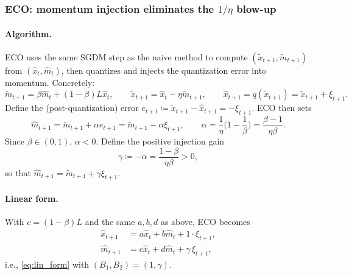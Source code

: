 \documentclass[11pt, a4paper, onecolumn, copyright, goog]{google}
\theoremstyle{plain}
\theoremstyle{definition}
\theoremstyle{remark}
\begin{document}
\subsubsection{ECO: momentum injection eliminates the $1/\eta$ blow-up}

\paragraph{Algorithm.}
ECO uses the same SGDM step as the naive method to compute $(\tilde x_{t+1},\tilde m_{t+1})$ from $(\hat x_t,\hat m_t)$,
then quantizes and injects the quantization error into momentum.
Concretely:
\begin{equation}
    \tilde m_{t+1}=\beta \hat m_t + (1-\beta)L\hat x_t,\qquad
    \tilde x_{t+1}=\hat x_t-\eta \tilde m_{t+1},\qquad
    \hat x_{t+1}=q(\tilde x_{t+1})=\tilde x_{t+1}+\xi_{t+1}.
\end{equation}
Define the (post-quantization) error $e_{t+1}\coloneqq \tilde x_{t+1}-\hat x_{t+1}=-\xi_{t+1}$. ECO then sets
\begin{equation}
\label{eq:eco_inject}
    \hat m_{t+1}=\tilde m_{t+1}+\alpha e_{t+1}
    = \tilde m_{t+1}-\alpha \xi_{t+1},
    \qquad
    \alpha=\frac{1}{\eta}\Big(1-\frac{1}{\beta}\Big)=\frac{\beta-1}{\eta\beta}.
\end{equation}
Since $\beta\in(0,1)$, $\alpha<0$. Define the positive injection gain
\begin{equation}
\label{eq:gamma_def}
    \gamma\coloneqq -\alpha=\frac{1-\beta}{\eta\beta}>0,
\end{equation}
so that $\hat m_{t+1}=\tilde m_{t+1}+\gamma\xi_{t+1}$.

\paragraph{Linear form.}
With $c=(1-\beta)L$ and the same $a,b,d$ as above, ECO becomes
\begin{equation}
\label{eq:eco_lin}
\begin{aligned}
    \hat x_{t+1} &= a\hat x_t + b \hat m_t + 1\cdot \xi_{t+1},\\
    \hat m_{t+1} &= c\hat x_t + d \hat m_t + \gamma\,\xi_{t+1},
\end{aligned}
\end{equation}
i.e., \eqref{eq:lin_form} with $(B_1,B_2)=(1,\gamma)$.
\end{document}
